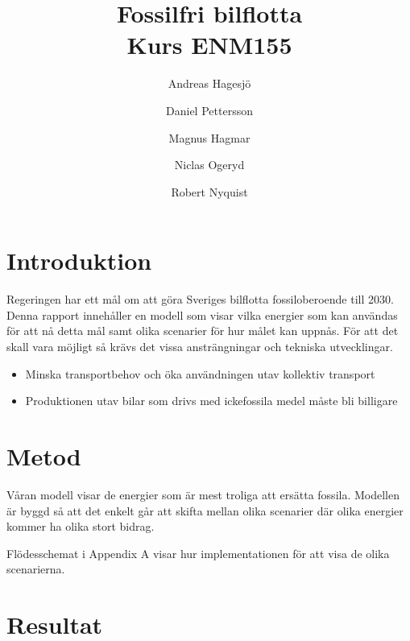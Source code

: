 \documentclass[a4paper,11pt,fleqn, titlepage]{article}
\author{Andreas Hagesjö \and Daniel Pettersson \and
Magnus Hagmar \and Niclas Ogeryd \and Robert Nyquist}
\title{Fossilfri bilflotta \\ Kurs ENM155}
\begin{document}
\maketitle

\section{Introduktion}
Regeringen har ett mål om att göra Sveriges bilflotta fossiloberoende till 2030. Denna rapport innehåller en modell som visar vilka energier som kan användas för att nå detta mål samt olika scenarier för hur målet kan uppnås.
För att det skall vara möjligt så krävs det vissa ansträngningar och tekniska utvecklingar.


\begin{itemize}
  \item Minska transportbehov och öka användningen utav kollektiv transport 
  \item Produktionen utav bilar som drivs med ickefossila medel måste bli billigare
 
\end{itemize}

\section{Metod}

Våran modell visar de energier som är mest troliga att ersätta fossila. Modellen är byggd så att det enkelt går att skifta mellan olika scenarier där olika energier kommer ha olika stort bidrag.


Flödesschemat i Appendix A visar hur implementationen för att visa de olika scenarierna.

\section{Resultat}
\end{document}
